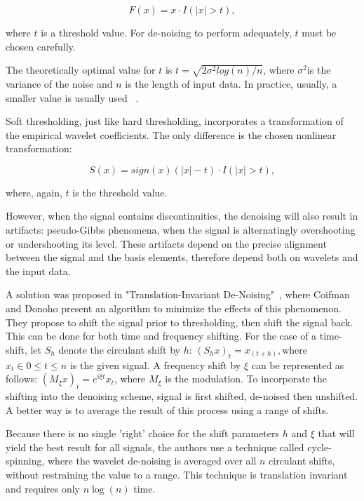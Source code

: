\begin{equation}
    F(x)=x\cdot I(|x|>t),
    \label{eq:wavelet_1}
\end{equation}

where $t$ is a threshold value. For de-noising to perform adequately, $t$ must be chosen carefully.

The theoretically optimal value for $t$ is $t=\sqrt{2\sigma^{2}log(n)/n}$, where $\sigma^{2}$is the variance of the noise and $n$ is the length of input data. In practice, usually, a smaller value is usually used ~\cite{thresholding}.

Soft thresholding, just like hard thresholding, incorporates a transformation of the empirical wavelet coefficients. The only difference is the chosen nonlinear transformation:

\begin{equation}
    S(x)=sign(x)(|x|-t)\cdot I(|x|>t),
    \label{eq:wavelet_2}
\end{equation}

where, again, $t$ is the threshold value.

However, when the signal contains discontinuities, the denoising will also result in artifacts: pseudo-Gibbs phenomena, when the signal is alternatingly overshooting or undershooting its level. These artifacts depend on the precise alignment between the signal and the basis elements, therefore depend both on wavelets and the input data. 

A solution was proposed in "Translation-Invariant De-Noising"~\cite{wavelet}, where Coifman and Donoho present an algorithm to minimize the effects of this phenomenon. They propose to shift the signal prior to thresholding, then shift the signal back. This can be done for both time and frequency shifting. For the case of a time-shift, let $S_{h}$ denote the circulant shift by $h$: $(S_{h}x)_{t}=x_{(t+h)}, $where $x_{t}\in0\leq t\leq n$ is the given signal. A frequency shift by $\xi$ can be represented as follows: $(M_{\xi}x)_{t}=e^{i\xi t}x_{t}$, where $M_{\xi}$ is the modulation. To incorporate the shifting into the denoising scheme, signal is first shifted, de-noised then unshifted. A better way is to average the result of this process using a range of shifts.

Because there is no single 'right' choice for the shift parameters $h$ and $\xi$ that will yield the best result for all signals, the authors use a technique called cycle-spinning, where the wavelet de-noising is averaged over all $n$ circulant shifts, without restraining the value to a range. This technique is translation invariant and requires only $n\log(n)$ time.

